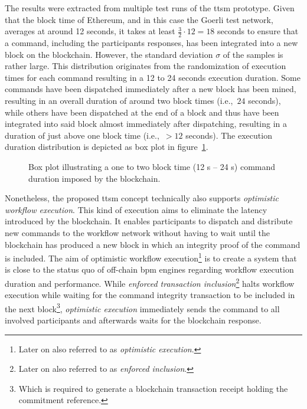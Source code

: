 The results were extracted from multiple test runs of the \gls{ttsm} prototype. Given that the block time of Ethereum, and in this case the Goerli test network, averages at around 12 seconds, it takes at least $\frac{3}{2} \cdot 12 = 18$ seconds to ensure that a command, including the participants responses, has been integrated into a new block on the blockchain. However, the standard deviation $\sigma$ of the samples is rather large. This distribution originates from the randomization of execution times for each command resulting in a 12 to 24 seconds execution duration. Some commands have been dispatched immediately after a new block has been mined, resulting in an overall duration of around two block times (i.e.,\ $24$ seconds), while others have been dispatched at the end of a block and thus have been integrated into said block almost immediately after dispatching, resulting in a duration of just above one block time (i.e.,\ $>12$ seconds). The execution duration distribution is depicted as box plot in figure~\ref{fig:evaluation:simulations:box_chart_transaction_inclusion}.

\begin{figure}[h]
    \caption{Box plot illustrating a one to two block time (12 s -- 24 s) command duration imposed by the blockchain.}
    \label{fig:evaluation:simulations:box_chart_transaction_inclusion}
\end{figure}

Nonetheless, the proposed \gls{ttsm} concept technically also supports \textit{optimistic workflow execution}. This kind of execution aims to eliminate the latency introduced by the blockchain. It enables participants to dispatch and distribute new commands to the workflow network without having to wait until the blockchain has produced a new block in which an integrity proof of the command is included. The aim of optimistic workflow execution\footnote{Later on also referred to as \textit{optimistic execution}.} is to create a system that is close to the status quo of off-chain \gls{bpm} engines regarding workflow execution duration and performance. While \textit{enforced transaction inclusion}\footnote{Later on also referred to as \textit{enforced inclusion}.} halts workflow execution while waiting for the command integrity transaction to be included in the next block\footnote{Which is required to generate a blockchain transaction receipt holding the commitment reference.}, \textit{optimistic execution} immediately sends the command to all involved participants and afterwards waits for the blockchain response.

